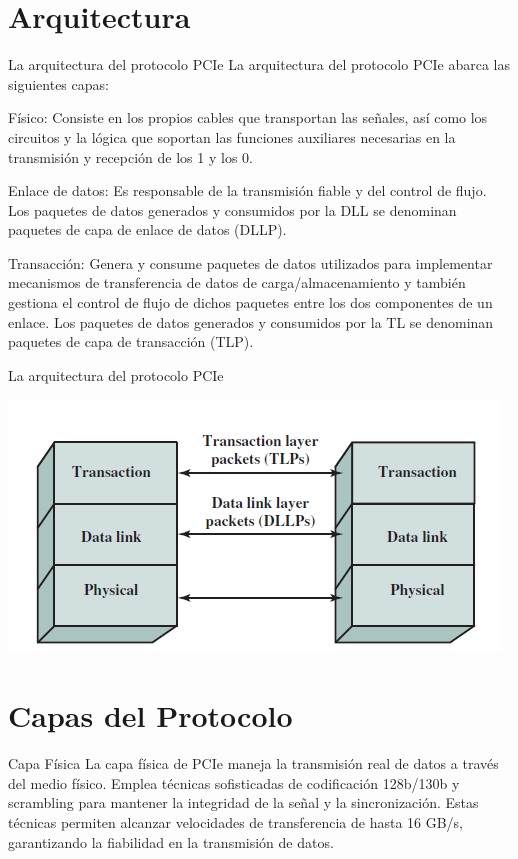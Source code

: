 \documentclass[presentation]{beamer}
\begin{document}
\section{Arquitectura}
\label{sec:org53d85da}
\begin{frame}[label={sec:org3052cc1}]{La arquitectura del protocolo PCIe}
La arquitectura del protocolo PCIe abarca las siguientes capas:

\alert{\alert{Físico:}} Consiste en los propios cables que transportan las señales, así como los
circuitos y la lógica que soportan las funciones auxiliares necesarias en la
transmisión y recepción de los 1 y los 0.

\alert{\alert{Enlace de datos:}} Es responsable de la transmisión fiable y del control de flujo. Los
paquetes de datos generados y consumidos por la DLL se denominan paquetes de capa
de enlace de datos (DLLP).

\alert{\alert{Transacción:}} Genera y consume paquetes de datos utilizados para implementar
mecanismos de transferencia de datos de carga/almacenamiento y también gestiona
el control de flujo de dichos paquetes entre los dos componentes de un enlace. Los
paquetes de datos generados y consumidos por la TL se denominan paquetes de capa
de transacción (TLP).
\end{frame}

\begin{frame}[label={sec:org6e22a58}]{La arquitectura del protocolo PCIe}
\begin{center}
\includegraphics[width=.9\linewidth]{./Images/arquitectura.png}
\end{center}
\end{frame}

\section{Capas del Protocolo}
\label{sec:org811f028}
\begin{frame}[label={sec:org27b5e01}]{Capa Física}
La capa física de PCIe maneja la transmisión real de datos a través del medio físico. Emplea técnicas sofisticadas de codificación 128b/130b y scrambling para mantener la integridad de la señal y la sincronización. Estas técnicas permiten alcanzar velocidades de transferencia de hasta 16 GB/s, garantizando la fiabilidad en la transmisión de datos.
\end{frame}
\end{document}
